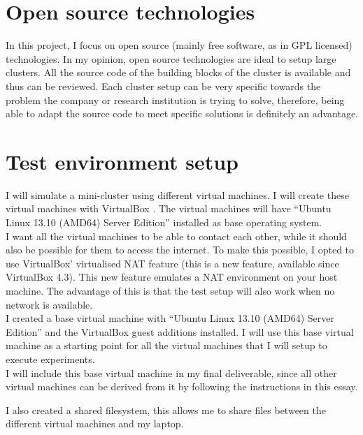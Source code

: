 \documentclass[12pt]{report}
\begin{document}
\section{Open source technologies}
In this project, I focus on open source (mainly free software, as in
GPL licensed) technologies. In my opinion,
open source technologies are ideal to setup large clusters. 
All the source code of the building blocks of the cluster is available
and thus can be reviewed. Each cluster setup can be very
specific towards the problem the company or research institution is
trying to solve, therefore, being able to adapt the source code to
meet specific solutions is definitely an advantage.

\section{Test environment setup}
I will simulate a mini-cluster using different virtual machines. I
will create these virtual machines with VirtualBox
\cite{virtualbox_soft:2013}.  The virtual machines will have
``Ubuntu Linux 13.10 (AMD64) Server Edition''
\cite{ubuntu_server_13_10:2013} installed as base operating system.\\

I want all the virtual machines to be able to contact each other,
while it should also be possible for them to access
the internet.
To make this possible, I opted to use VirtualBox' virtualised NAT
feature (this is a new feature, available since VirtualBox
4.3).
This new feature emulates a NAT environment on your host machine.
The advantage of this is that the test setup will also work when no
network is available.\\

I created a base virtual machine with ``Ubuntu Linux 13.10 (AMD64)
Server Edition''  and the VirtualBox guest additions
installed. I will use this base virtual machine as a starting point
for all the virtual machines that I will setup to execute
experiments.\\
I will include this base virtual machine in my final deliverable,
since all other virtual machines can be derived from it by following
the instructions in this essay.

I also created a shared filesystem, this allows me to share files between the
different virtual machines and my laptop.
\end{document}
